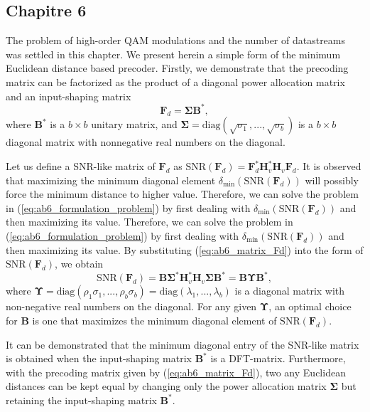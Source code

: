 \subsection*{Chapitre 6}
The problem of high-order QAM modulations and the number of datastreams was settled in this chapter. We present herein a simple form of the minimum Euclidean distance based precoder. Firstly, we demonstrate that the precoding matrix can be factorized as the product of a diagonal power allocation matrix and an input-shaping matrix
\begin{equation}
\label{eq:ab6_matrix_Fd}
	\mathbf{F}_d = \mathbf{\Sigma} \mathbf{B}^* ,
\end{equation}
where $\mathbf{B}^*$ is a $b \times b$ unitary matrix, and $\mathbf{\Sigma}=\text{diag} (\sqrt{\sigma_1},...,\sqrt{\sigma_b})$ is a $b \times b$ diagonal matrix with nonnegative real numbers on the diagonal. 

Let us define a SNR-like matrix of $\mathbf{F}_d$ as $\text{SNR}(\mathbf{F}_d) =  \mathbf{F}_d^*  \mathbf{H}_v^* \mathbf{H}_v \mathbf{F}_d$. It is observed that maximizing the minimum diagonal element  $\delta_{\min} (\text{SNR}(\mathbf{F}_d))$ will possibly force the minimum distance to higher value. Therefore, we can solve the problem in (\ref{eq:ab6_formulation_problem}) by first dealing with $\delta_{\min} (\text{SNR}(\mathbf{F}_d))$ and then maximizing its value. Therefore, we can solve the problem in (\ref{eq:ab6_formulation_problem}) by first dealing with $\delta_{\min} (\text{SNR}(\mathbf{F}_d))$ and then maximizing its value. By substituting (\ref{eq:ab6_matrix_Fd}) into the form of  $\text{SNR}(\mathbf{F}_d)$, we obtain
\begin{equation}
	\text{SNR}(\mathbf{F}_d) = \mathbf{B} \mathbf{\Sigma}^* \mathbf{H}_v^* \mathbf{H}_v \mathbf{\Sigma} \mathbf{B}^* =  \mathbf{B}  \mathbf{\Upsilon}  \mathbf{B}^* ,
\end{equation}
where $\mathbf{\Upsilon} = \text{diag} (\rho_1 \sigma_1,...,\rho_b \sigma_b) = \text{diag} (\lambda_1,..., \lambda_b)$ is a diagonal matrix with non-negative real numbers on the diagonal. For any given $\mathbf{\Upsilon}$, an optimal choice for $\mathbf{B}$ is one that maximizes the minimum diagonal element of $\text{SNR}(\mathbf{F}_d)$. 

It can be demonstrated that the minimum diagonal entry of the SNR-like matrix is obtained when the input-shaping matrix $\mathbf{B}^*$ is a DFT-matrix. Furthermore, with the precoding matrix given by (\ref{eq:ab6_matrix_Fd}), two any Euclidean distances can be kept equal by changing only the power allocation matrix $\mathbf{\Sigma}$ but retaining the input-shaping matrix $\mathbf{B}^*$. 

